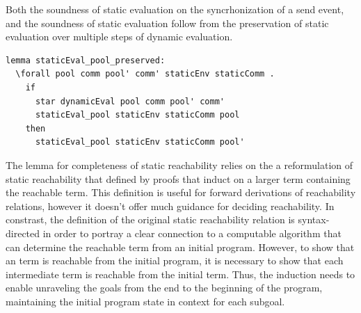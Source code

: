\documentclass[10pt]{article}
\begin{document}
Both the soundness of static evaluation on the syncrhonization of a send event,
and the soundness of static evaluation follow from
the preservation of static evaluation over multiple steps of dynamic evaluation.

\begin{lstlisting}[language=logic, mathescape]
  lemma staticEval_pool_preserved:
  \forall pool comm pool' comm' staticEnv staticComm .
    if
      star dynamicEval pool comm pool' comm' 
      staticEval_pool staticEnv staticComm pool
    then
      staticEval_pool staticEnv staticComm pool'
\end{lstlisting}

The lemma for completeness of static reachability relies on the a reformulation of
static reachability that defined by proofs that induct on a larger term
containing the reachable term.  This definition is useful for forward derivations
of reachability relations, however it doesn't offer much guidance for deciding reachability. 
In constrast, the definition of the original static reachability relation is
syntax-directed in order to portray a clear connection to
a computable algorithm that can determine the reachable term from an initial program.
However, to show that an term is reachable from the initial program, it is necessary to
show that each intermediate term is reachable from the initial term.  Thus, the
induction needs to enable unraveling the goals from the end to the beginning of the program,
maintaining the initial program state in context for each subgoal.
\end{document}
